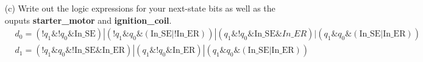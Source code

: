 \documentclass{article}
\theoremstyle{remark}
\theoremstyle{definition}
\begin{document}
\begin{enumerate}
        \item[(c)] Write out the logic expressions for your next-state bits as well as the ouputs \textbf{starter\_motor} and \textbf{ignition\_coil}.
        \begin{equation*}
            \begin{aligned}
                &d_0 = \left( !q_1 \& !q_0 \& \text{In\_SE} \right) | \left( !q_1 \& q_0 \& \left( \text{In\_SE} | !\text{In\_ER} \right) \right) | \left( q_1 \& !q_0 \& \text{In\_SE} \& In\_ER \right) | \left( q_1 \& q_0 \& \left( \text{In\_SE} | \text{In\_ER} \right) \right) \\
                &d_1 = \left( !q_1 \& q_0 \& !\text{In\_SE} \& \text{In\_ER} \right) | \left( q_1 \& !q_0 \& \text{In\_ER} \right) | \left( q_1 \& q_0 \& \left( \text{In\_SE} | \text{In\_ER} \right) \right)
            \end{aligned}
        \end{equation*}
    \end{enumerate}
\end{document}
